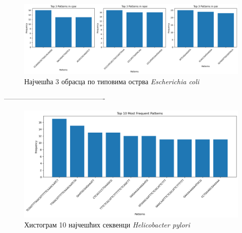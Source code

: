 \documentclass[12pt]{article}
\begin{document}
\begin{figure}[htbp]
    \centering
    \includegraphics[width=\linewidth]{images/top_3_cpai.png}
    \caption{Најчешћа 3 обрасца по типовима острва \textit{Escherichia coli}}
    \label{fig:top3_by_islands}
\end{figure}


-------------------------------------------

\begin{figure}[htbp]
    \centering
    \includegraphics[width=\linewidth]{images/top_10_hist_h_pylori.png}
    \caption{Хистограм 10 најчешћих секвенци \textit{Helicobacter pylori}}
    \label{fig:top10histhpylori}
\end{figure}

\newpage

\end{document}
